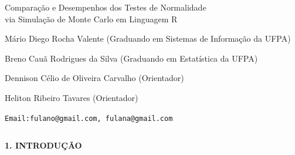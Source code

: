 \documentclass[final]{beamer}
\begin{document}
\begin{frame}[t]



\vspace*{7.0cm}
\centering
{ Comparação e Desempenhos dos Testes de Normalidade\\ 
  via Simulação de Monte Carlo em Linguagem R\par}
  
\vspace{0.8cm}
{ Mário Diego Rocha Valente (Graduando em Sistemas de Informação da UFPA)\par}

\vspace{0.8cm}
{ Breno Cauã Rodrigues da Silva (Graduando em Estatística da UFPA)\par}

\vspace{0.8cm}
{ Dennison Célio de Oliveira Carvalho (Orientador)\par}

\vspace{0.8cm}
{ Heliton Ribeiro Tavares (Orientador)\par}

{\texttt{Email:fulano@gmail.com, fulana@gmail.com 
}\par}
\vspace{3cm}


\begin{columns}[t,totalwidth=0.6\paperwidth]
  \hspace*{2.5cm}
  \begin{column}{0.45\paperwidth}


    {\large\bfseries 1. INTRODUÇÃO}\par
    \justifying


\end{column}
\end{columns}
\end{frame}
\end{document}
